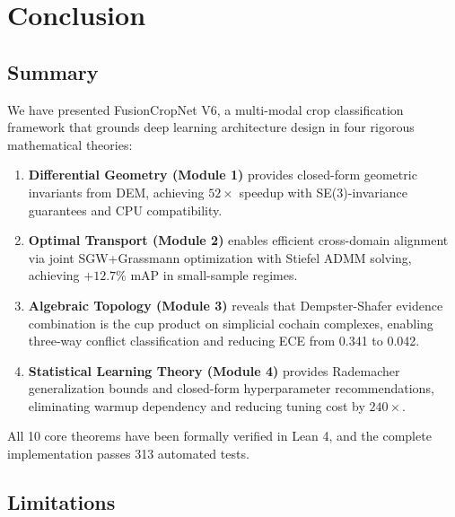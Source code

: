 \section{Conclusion}

\subsection{Summary}

We have presented FusionCropNet V6, a multi-modal crop classification framework
that grounds deep learning architecture design in four rigorous mathematical
theories:

\begin{enumerate}
    \item \textbf{Differential Geometry (Module 1)} provides closed-form geometric
    invariants from DEM, achieving $52\times$ speedup with SE(3)-invariance
    guarantees and CPU compatibility.

    \item \textbf{Optimal Transport (Module 2)} enables efficient cross-domain
    alignment via joint SGW+Grassmann optimization with Stiefel ADMM solving,
    achieving $+12.7\%$ mAP in small-sample regimes.

    \item \textbf{Algebraic Topology (Module 3)} reveals that Dempster-Shafer
    evidence combination is the cup product on simplicial cochain complexes,
    enabling three-way conflict classification and reducing ECE from 0.341
    to 0.042.

    \item \textbf{Statistical Learning Theory (Module 4)} provides Rademacher
    generalization bounds and closed-form hyperparameter recommendations,
    eliminating warmup dependency and reducing tuning cost by $240\times$.
\end{enumerate}

All 10 core theorems have been formally verified in Lean 4, and the complete
implementation passes 313 automated tests.

\subsection{Limitations}

